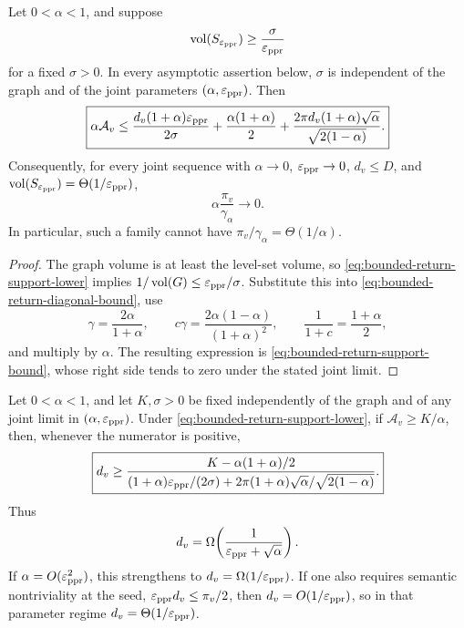 \documentclass[11pt]{article}
\begin{document}
\begin{corollary}
\label{cor:bounded-return-support}
Let $0<\alpha<1$, and suppose
\begin{equation}
 \operatorname{vol}(S_{\varepsilon_{\mathrm{ppr}}})\ge\frac{\sigma}{\varepsilon_{\mathrm{ppr}}}
 \label{eq:bounded-return-support-lower}
\end{equation}
for a fixed $\sigma>0$.  In every asymptotic assertion below, $\sigma$ is
independent of the graph and of the joint parameters
$(\alpha,\varepsilon_{\mathrm{ppr}})$.  Then
\begin{equation}
 \boxed{
 \alpha\mathcal A_v
 \le
 \frac{d_v(1+\alpha)\varepsilon_{\mathrm{ppr}}}{2\sigma}
 +\frac{\alpha(1+\alpha)}{2}
 +\frac{2\pi d_v(1+\alpha)\sqrt\alpha}
        {\sqrt{2(1-\alpha)}}.}
 \label{eq:bounded-return-support-bound}
\end{equation}
Consequently, for every joint sequence with
$\alpha\to0$, $\varepsilon_{\mathrm{ppr}}\to0$, $d_v\le D$, and
$\operatorname{vol}(S_{\varepsilon_{\mathrm{ppr}}})=\Theta(1/\varepsilon_{\mathrm{ppr}})$,
\begin{equation}
 \alpha\frac{\pi_v}{\gamma_{\alpha}}\longrightarrow0.
 \label{eq:bounded-return-impossibility}
\end{equation}
In particular, such a family cannot have
$\pi_v/\gamma_{\alpha}=\Theta(1/\alpha)$.
\end{corollary}

\begin{proof}
The graph volume is at least the level-set volume, so
\eqref{eq:bounded-return-support-lower} implies
$1/\operatorname{vol}(G)\le\varepsilon_{\mathrm{ppr}}/\sigma$.  Substitute this into
\eqref{eq:bounded-return-diagonal-bound}, use
\[
 \gamma=\frac{2\alpha}{1+\alpha},
 \qquad
 c\gamma=\frac{2\alpha(1-\alpha)}{(1+\alpha)^2},
 \qquad
 \frac{1}{1+c}=\frac{1+\alpha}{2},
\]
and multiply by $\alpha$.  The resulting expression is
\eqref{eq:bounded-return-support-bound}, whose right side tends to zero under
the stated joint limit.
\end{proof}

\begin{corollary}
\label{cor:bounded-return-degree}
Let $0<\alpha<1$, and let $K,\sigma>0$ be fixed independently of the graph
and of any joint limit in $(\alpha,\varepsilon_{\mathrm{ppr}})$.  Under
\eqref{eq:bounded-return-support-lower}, if
$\mathcal A_v\ge K/\alpha$, then, whenever the numerator is positive,
\begin{equation}
 \boxed{
 d_v\ge
 \frac{K-\alpha(1+\alpha)/2}
 {(1+\alpha)\varepsilon_{\mathrm{ppr}}/(2\sigma)
  +2\pi(1+\alpha)\sqrt\alpha/\sqrt{2(1-\alpha)}}.}
 \label{eq:bounded-return-degree-exact}
\end{equation}
Thus
\begin{equation}
 d_v=\Omega\!\left(\frac{1}{\varepsilon_{\mathrm{ppr}}+\sqrt\alpha}\right).
 \label{eq:bounded-return-degree-order}
\end{equation}
If $\alpha=O(\varepsilon_{\mathrm{ppr}}^2)$, this strengthens to
$d_v=\Omega(1/\varepsilon_{\mathrm{ppr}})$.  If one also requires semantic nontriviality at the
seed, $\varepsilon_{\mathrm{ppr}} d_v\le\pi_v/2$, then $d_v=O(1/\varepsilon_{\mathrm{ppr}})$, so in that parameter
regime $d_v=\Theta(1/\varepsilon_{\mathrm{ppr}})$.
\end{corollary}
\end{document}
